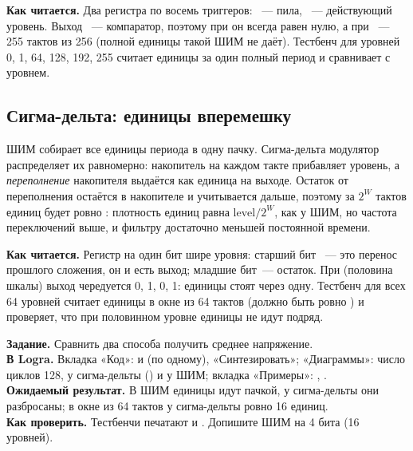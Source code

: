 
\textbf{Как читается.} Два регистра по восемь триггеров: ~--- пила,
~--- действующий уровень. Выход ~--- компаратор, поэтому
при  он всегда равен нулю, а при ~---
255 тактов из 256 (полной единицы такой ШИМ не даёт). Тестбенч
 для уровней 0, 1, 64, 128, 192, 255 считает единицы за один
полный период и сравнивает с уровнем.

\subsection{Сигма-дельта: единицы вперемешку}

ШИМ собирает все единицы периода в одну пачку. Сигма-дельта модулятор
распределяет их равномерно: накопитель на каждом такте прибавляет уровень, а
\emph{переполнение} накопителя выдаётся как единица на выходе. Остаток от
переполнения остаётся в накопителе и учитывается дальше, поэтому за
$2^W$ тактов единиц будет ровно : плотность единиц равна
$\text{level}/2^W$, как у ШИМ, но частота переключений выше, и фильтру
достаточно меньшей постоянной времени.


\textbf{Как читается.} Регистр  на один бит шире уровня: старший бит
~--- это перенос прошлого сложения, он и есть выход; младшие
 бит~--- остаток. При  (половина шкалы) выход
чередуется 0, 1, 0, 1: единицы стоят через одну. Тестбенч
 для всех 64 уровней считает единицы в окне из 64
тактов (должно быть ровно ) и проверяет, что при половинном уровне
единицы не идут подряд.

\begin{diybox}
\textbf{Задание.} Сравнить два способа получить среднее напряжение.\\
\textbf{В Logra.} Вкладка «Код»:  и  (по
одному), «Синтезировать»; «Диаграммы»: число циклов 128,  у
сигма-дельты () и  у ШИМ; вкладка «Примеры»:
, .\\
\textbf{Ожидаемый результат.} В ШИМ единицы идут пачкой, у сигма-дельты они
разбросаны; в окне из 64 тактов у сигма-дельты ровно 16 единиц.\\
\textbf{Как проверить.} Тестбенчи печатают  и
.  Допишите ШИМ на 4 бита (16 уровней).
\end{diybox}

